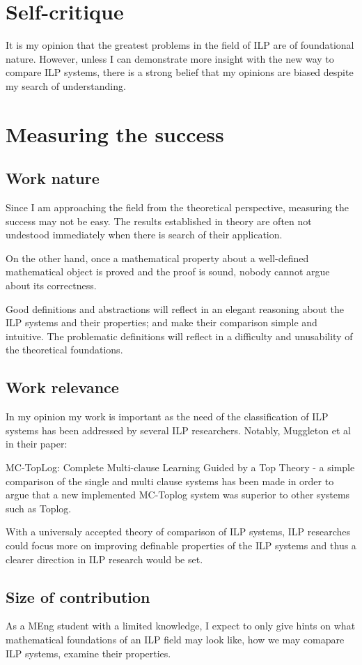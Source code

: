 \section{Self-critique}
It is my opinion that the greatest problems in the field of ILP are of foundational nature. However, unless I can demonstrate more insight with the new way to compare ILP systems, there is a strong belief that my opinions are biased despite my search of understanding.
\section{Measuring the success}

\subsection{Work nature}
Since I am approaching the field from the theoretical perspective, measuring the success may not be easy. The results established in theory are often not undestood immediately when there is search of their application.

On the other hand, once a mathematical property about a well-defined mathematical object is proved and the proof is sound, nobody cannot argue about its correctness.

Good definitions and abstractions will reflect in an elegant reasoning about the ILP systems and their properties; and make their comparison simple and intuitive. The problematic definitions will reflect in a difficulty and unusability of the theoretical foundations.

\subsection{Work relevance}
In my opinion my work is important as the need of the classification of ILP systems has been addressed by several ILP researchers. Notably, Muggleton et al in their paper:

MC-TopLog: Complete Multi-clause Learning Guided by a Top Theory - a simple comparison of the single and multi clause systems has been made in order to argue that a new implemented MC-Toplog system was superior to other systems such as Toplog.

With a universaly accepted theory of comparison of ILP systems, ILP researches could focus more on improving definable properties of the ILP systems and thus a clearer direction in ILP research would be set.

\subsection{Size of contribution}
As a MEng student with a limited knowledge, I expect to only give hints on what mathematical foundations of an ILP field may look like, how we may comapare ILP systems, examine their properties.

